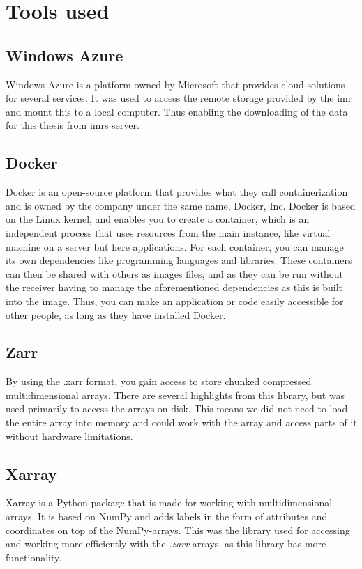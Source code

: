 \chapter{Tools used}

    \section{Windows Azure} \label{Windows Azure}
        Windows Azure \cite{azure} is a platform owned by Microsoft that provides cloud solutions for several services. It was used to access the remote storage provided by the \gls{imr} and mount this to a local computer. Thus enabling the downloading of the data for this thesis from \gls{imr}s server. 
    
    \section{Docker} \label{Docker}
        Docker \cite{docker} is an open-source platform that provides what they call containerization and is owned by the company under the same name, Docker, Inc. Docker is based on the Linux kernel, and enables you to create a container, which is an independent process that uses resources from the main instance, like virtual machine on a server but here applications. For each container, you can manage its own dependencies like programming languages and libraries. These containers can then be shared with others as images files, and as they can be run without the receiver having to manage the aforementioned dependencies as this is built into the image. Thus, you can make an application or code easily accessible for other people, as long as they have installed Docker.
        
    \section{Zarr} \label{Zarr}
        By using the .zarr \cite{zarr} format, you gain access to store chunked compressed  multidimensional arrays. There are several highlights from this library, but was used primarily to access the arrays on disk. This means we did not need to load the entire array into memory and could work with the array and access parts of it without hardware limitations.
        

    \section{Xarray} \label{Xarray}
        Xarray\cite{xarray} is a Python package that is made for working with multidimensional arrays. It is based on NumPy and adds labels in the form of attributes and coordinates on top of the NumPy-arrays. This was the library used for accessing and working more efficiently with the \textit{.zarr} arrays, as this library has more functionality.
        
